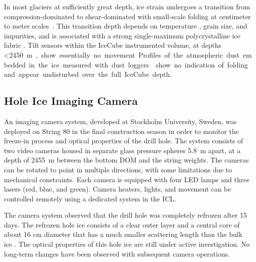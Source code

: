 In most glaciers at sufficiently great depth, ice strain undergoes a
transition from compression-dominated to shear-dominated with
small-scale folding at centimeter to meter scales~\cite{montagnat14,jansen16}.  This transition depth depends on
temperature \cite{price2002temperature}, grain size, and impurities, and is
associated with a strong single-maximum polycrystalline ice fabric
\cite{cuffey10}.  Tilt sensors within the IceCube instrumented volume, at
depths \SI{<2450}m, show essentially no movement.  Profiles of the
atmospheric dust embedded in the ice measured with dust loggers \cite{I3:dustlogger} show no
indication of folding and appear undisturbed over the full IceCube depth.

\subsection{Hole Ice Imaging Camera}

An imaging camera system, developed at Stockholm University, Sweden, was deployed on String 80 in the final
construction season in order to monitor the freeze-in process and optical
properties of the drill hole.  The system consists of two video cameras
housed in separate glass pressure spheres \SI{5.8}{m} apart, at a
depth of \SI{2455}{m} between the bottom DOM and the string
weights. The cameras can be rotated to point in multiple directions, with some
limitations due to mechanical constraints.  Each
camera is equipped with four LED lamps and three lasers (red, blue, and
green).  Camera heaters, lights, and movement can be controlled remotely
using a dedicated system in the ICL.  

The camera system observed that the drill hole was completely refrozen after
15 days.  The refrozen hole ice consists of a clear outer
layer and a central core of about 16 cm diameter that has a much
smaller scattering length than the bulk ice \cite{rongen_vlvnt15}.  The
optical properties of this hole ice are still under active investigation.
No long-term changes have been observed with subsequent camera operations.
